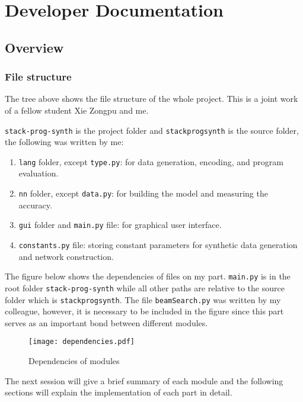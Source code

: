 \chapter{Developer Documentation}
\label{dev}
\section{Overview}
\label{sec:overview}
\subsection{File structure}

The tree above shows the file structure of the whole project. This is a joint work of a fellow student Xie Zongpu and me. 

\texttt{stack-prog-synth} is the project folder and \texttt{stackprogsynth} is the source folder, the following was written by me:
\begin{enumerate}
    \item \texttt{lang} folder, except \texttt{type.py}: for data generation, encoding, and program evaluation.
    \item \texttt{nn} folder, except \texttt{data.py}: for building the model and measuring the accuracy.
    \item \texttt{gui} folder and \texttt{main.py} file: for graphical user interface.
    \item \texttt{constants.py} file: storing constant parameters for synthetic data generation and network construction. 
\end{enumerate}

The figure below shows the dependencies of files on my part. \texttt{main.py} is in the root folder \texttt{stack-prog-synth} while all other paths are relative to the source folder which is \texttt{stackprogsynth}. The file \texttt{beamSearch.py} was written by my colleague, however, it is necessary to be included in the figure since this part serves as an important bond between different modules.
\begin{figure}[H]
    \centering
    \texttt{[image: dependencies.pdf]}
    \caption{Dependencies of modules}
    \label{fig:dep}
\end{figure}
The next session will give a brief summary of each module and the following sections will explain the implementation of each part in detail.

